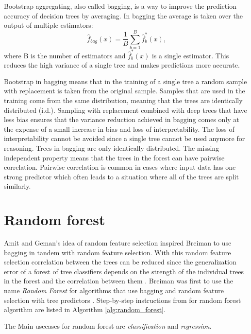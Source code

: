 Bootstrap aggregating, also called bagging, is a way to improve the prediction accuracy of decision trees by averaging. In bagging the average is taken over the output of multiple estimators:
\begin{equation}
    \hat {f}_{bag}(x) = \frac{1}{B}\sum_{b = 1}^{B} \hat {f}^{*}_{b}(x) \text{,}
\end{equation}
where B is the number of estimators and $\hat {f}^{*}_{b}(x)$ is a single estimator. This reduces the high variance of a single tree and makes predictions more accurate.

Bootstrap in bagging means that in the training of a single tree a random sample with replacement is taken from the original sample. Samples that are used in the training come from the same distribution, meaning that the trees are identically distributed (i.d.). Sampling with replacement combined with deep trees that have less bias ensures that the variance reduction achieved in bagging comes only at the expense of a small increase in bias and loss of interpretability. The loss of interpretability cannot be avoided since a single tree cannot be used anymore for reasoning. Trees in bagging are only identically distributed. The missing independent property means that the trees in the forest can have pairwise correlation. Pairwise correlation is common in cases where input data has one strong predictor which often leads to a situation where all of the trees are split similarly. \cite{friedman2001elements}

\section{Random forest}
Amit and Geman's \cite{amit1997shape} idea of random feature selection inspired Breiman to use bagging in tandem with random feature selection. With this random feature selection correlation between the trees can be reduced since the generalization error of a forest of tree classifiers depends on the strength of the individual trees in the forest and the correlation between them \cite{breiman2001random}. Breiman was first to use the name \textit{Random Forest} for algorithms that use bagging and random feature selection with tree predictors \cite{breiman2001random}. Step-by-step instructions from \cite{friedman2001elements} for random forest algorithm are listed in Algorithm \ref{alg:random_forest}.

The Main usecases for random forest are \textit{classification} and \textit{regression}.

